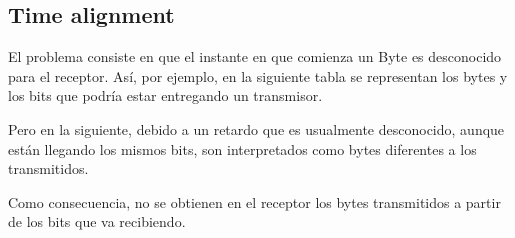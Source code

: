 \subsection{Time alignment}

El problema consiste en que el instante en que comienza un Byte es desconocido para el receptor. Así, por ejemplo, en la siguiente tabla se representan los bytes y los bits que podría estar entregando un transmisor. 
\vspace{200px}
\begin{table}[h!]
	\captionsetup{justification = raggedright,singlelinecheck = false}
	\caption{Alguna descripción.}
	\label{tabla:tabla7}
	\centering
\end{table}



Pero en la siguiente, debido a un retardo que es usualmente desconocido, aunque están llegando los mismos bits, son interpretados como bytes diferentes a los transmitidos. 

\begin{table}[h!]
	\captionsetup{justification = raggedright,singlelinecheck = false}
	\caption{Sin alguna descripción.}
	\label{tabla:tabla8}
	\centering
\end{table}


Como consecuencia, no se obtienen en el receptor los bytes transmitidos a partir de los bits que va recibiendo. \\

